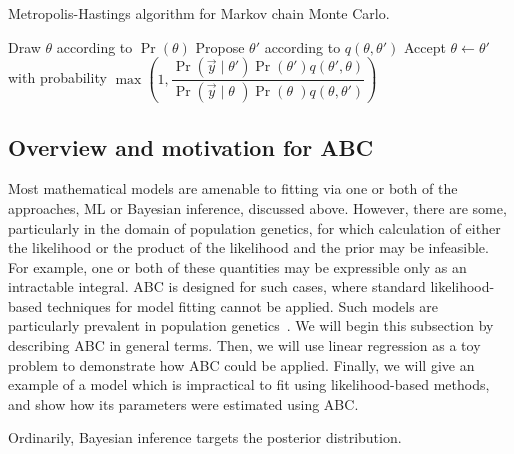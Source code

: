 \begin{algorithm}
  \label{alg:mh}
  \caption{Metropolis-Hastings algorithm for Markov chain Monte Carlo.}
  \begin{algorithmic}
    \State Draw $\theta$ according to $\Pr(\theta)$
    \Loop
      \State Propose $\theta'$ according to $q(\theta, \theta')$
      \State Accept $\theta \gets \theta'$ with probability
      $\max \left( 1, 
       \dfrac{\Pr(\vec{y} \mid \theta') \Pr(\theta') q(\theta', \theta)}
             {\Pr(\vec{y} \mid \theta\phantom{'}) \Pr(\theta\phantom{'}) q(\theta, \theta')}
       \right)$
    \EndLoop
  \end{algorithmic}
  \label{alg:mh}
\end{algorithm}

\subsection{Overview and motivation for ABC}
\label{subsec:abcoverview}

Most mathematical models are amenable to fitting via one or both of the
approaches, \gls{ML} or Bayesian inference, discussed above. However, there are
some, particularly in the domain of population genetics, for which calculation
of either the likelihood or the product of the likelihood and the prior may be
infeasible. For example, one or both of these quantities may be expressible
only as an intractable integral. \Gls{ABC} is designed for such cases, where
standard likelihood-based techniques for model fitting cannot be applied. Such
models are particularly prevalent in population
genetics~\autocite{beaumont2002approximate, beaumont2010approximate}. We will
begin this subsection by describing \gls{ABC} in general terms. Then, we will
use linear regression as a toy problem to demonstrate how \gls{ABC} could be
applied. Finally, we will give an example of a model which is impractical to
fit using likelihood-based methods, and show how its parameters were estimated
using \gls{ABC}.

Ordinarily, Bayesian inference targets the posterior distribution.


